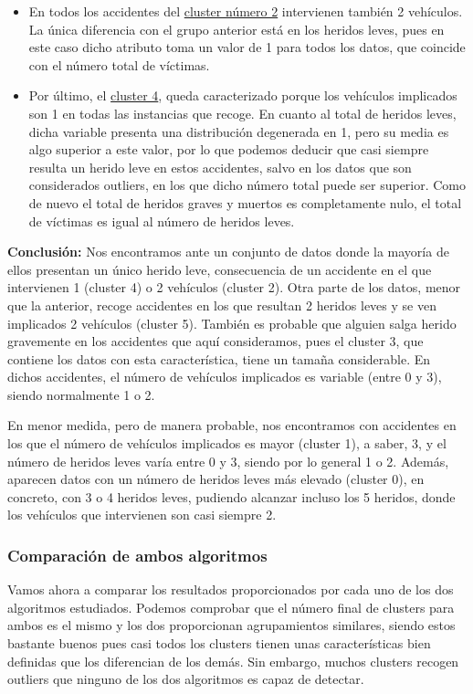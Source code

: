 \documentclass[a4paper,11pt]{book}
\begin{document}
\begin{itemize}
	\item En todos los accidentes del \underline{cluster número 2} intervienen también 2 vehículos. La única diferencia con el grupo anterior está en los heridos leves, pues en este caso dicho atributo toma un valor de 1 para todos los datos, que coincide con el número total de víctimas. 
	
	\item Por último, el \underline{cluster 4}, queda caracterizado porque los vehículos implicados son 1 en todas las instancias que recoge. 
	En cuanto al total de heridos leves, dicha variable presenta una distribución degenerada en 1, pero su media es algo superior a este valor, por lo que podemos deducir que casi siempre resulta un herido leve en estos accidentes, salvo en los datos que son considerados outliers, en los que dicho número total puede ser superior. Como de nuevo el total de heridos graves y muertos es completamente nulo, el total de víctimas es igual al número de heridos leves. 
\end{itemize}

\textbf{Conclusión:} Nos encontramos ante un conjunto de datos donde la mayoría de ellos presentan un único herido leve, consecuencia de un accidente en el que intervienen 1 (cluster 4) o 2 vehículos (cluster 2). Otra parte de los datos, menor que la anterior, recoge accidentes en los que resultan 2 heridos leves y se ven implicados 2 vehículos (cluster 5). También es probable que alguien salga herido gravemente en los accidentes que aquí consideramos, pues el cluster 3, que contiene los datos con esta característica, tiene un tamaña considerable. En dichos accidentes, el número de vehículos implicados es variable (entre 0 y 3), siendo normalmente 1 o 2.  

En menor medida, pero de manera probable, nos encontramos con accidentes en los que el número de vehículos implicados es mayor (cluster 1), a saber, 3, y el número de heridos leves varía entre 0 y 3, siendo por lo general 1 o 2. Además, aparecen datos con un número de heridos leves más elevado (cluster 0), en concreto, con 3 o 4 heridos leves, pudiendo alcanzar incluso los 5 heridos, donde los vehículos que intervienen son casi siempre 2. 

\newpage
\subsubsection{Comparación de ambos algoritmos}
Vamos ahora a comparar los resultados proporcionados por cada uno de los dos algoritmos estudiados. Podemos comprobar que el número final de clusters para ambos es el mismo y los dos proporcionan agrupamientos similares, siendo estos bastante buenos pues casi todos los clusters tienen unas características bien definidas que los diferencian de los demás. Sin embargo, muchos clusters recogen outliers que ninguno de los dos algoritmos es capaz de detectar. 
\end{document}
